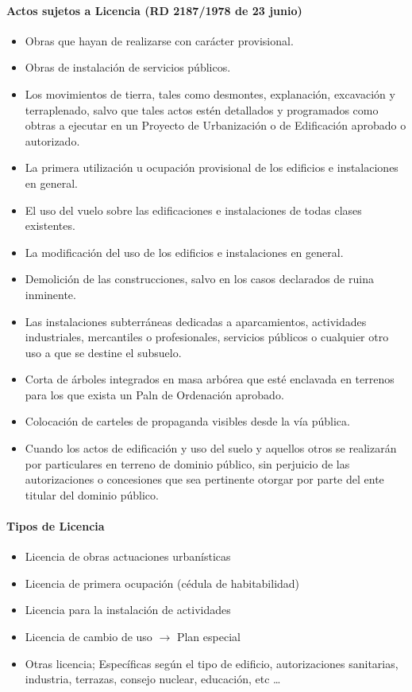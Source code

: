 \paragraph{Actos sujetos a Licencia (RD 2187/1978 de 23 junio)}
\begin{itemize}
    \item Obras que hayan de realizarse con carácter provisional.
    \item Obras de instalación de servicios públicos.
    \item Los movimientos de tierra, tales como desmontes, explanación, excavación y terraplenado, salvo que tales actos estén detallados y programados como obtras a ejecutar en un Proyecto de Urbanización o de Edificación aprobado o autorizado.
    \item La primera utilización u ocupación provisional de los edificios e instalaciones en general.
    \item El uso del vuelo sobre las edificaciones e instalaciones de todas clases existentes.
    \item La modificación del uso de los edificios e instalaciones en general.
    \item Demolición de las construcciones, salvo en los casos declarados de ruina inminente.
    \item Las instalaciones subterráneas dedicadas a aparcamientos, actividades industriales, mercantiles o profesionales, servicios públicos o cualquier otro uso a que se destine el subsuelo.
    \item Corta de árboles integrados en masa arbórea que esté enclavada en terrenos para los que exista un Paln de Ordenación aprobado.
    \item Colocación de carteles de propaganda visibles desde la vía pública.
    \item Cuando los actos de edificación y uso del suelo y aquellos otros se realizarán por particulares en terreno de dominio público, sin perjuicio de las autorizaciones o concesiones que sea pertinente otorgar por parte del ente titular del dominio público.
\end{itemize}

\paragraph{Tipos de Licencia}
\begin{itemize}
    \item Licencia de obras actuaciones urbanísticas
    \item Licencia de primera ocupación (cédula de habitabilidad)
    \item Licencia para la instalación de actividades
    \item Licencia de cambio de uso $\rightarrow$ Plan especial
    \item Otras licencia;
    Específicas según el tipo de edificio, autorizaciones sanitarias, industria, terrazas, consejo nuclear, educación, etc \dots
\end{itemize}

